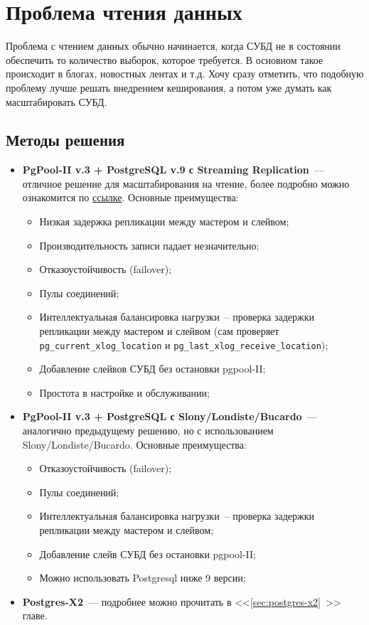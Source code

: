 \section{Проблема чтения данных}

Проблема с чтением данных обычно начинается, когда СУБД не в состоянии обеспечить то количество выборок, которое требуется. В основном такое происходит в блогах, новостных лентах и т.д. Хочу сразу отметить, что подобную проблему лучше решать внедрением кеширования, а потом уже думать как масштабировать СУБД.

\subsection{Методы решения}

\begin{itemize}
  \item \textbf{PgPool-II v.3 + PostgreSQL v.9 с Streaming Replication}~--- отличное решение для масштабирования на чтение, более подробно можно ознакомится по \href{http://pgpool.projects.pgfoundry.org/contrib\_docs/simple\_sr\_setting/index.html}{ссылке}. Основные преимущества:

  \begin{itemize}
    \item Низкая задержка репликации между мастером и слейвом;
    \item Производительность записи падает незначительно;
    \item Отказоустойчивость (failover);
    \item Пулы соединений;
    \item Интеллектуальная балансировка нагрузки~-- проверка задержки репликации между мастером и слейвом (сам проверяет \lstinline!pg_current_xlog_location! и \lstinline!pg_last_xlog_receive_location!);
    \item Добавление слейвов СУБД без остановки pgpool-II;
    \item Простота в настройке и обслуживании;
  \end{itemize}

  \item \textbf{PgPool-II v.3 + PostgreSQL с Slony/Londiste/Bucardo}~--- аналогично предыдущему решению, но с использованием Slony/Londiste/Bucardo. Основные преимущества:

  \begin{itemize}
    \item Отказоустойчивость (failover);
    \item Пулы соединений;
    \item Интеллектуальная балансировка нагрузки~-- проверка задержки репликации между мастером и слейвом;
    \item Добавление слейв СУБД без остановки pgpool-II;
    \item Можно использовать Postgresql ниже 9 версии;
  \end{itemize}

  \item \textbf{Postgres-X2}~--- подробнее можно прочитать в <<\ref{sec:postgres-x2}~>> главе.
\end{itemize}

